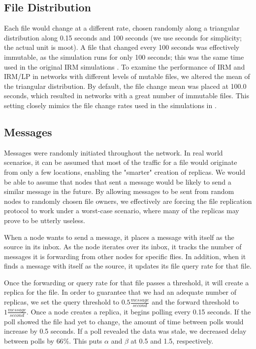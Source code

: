 \documentclass[10pt, conference, compsocconf, letterpaper]{IEEEtran} %
\begin{document}
\subsection{File Distribution}

Each file would change at a different rate, chosen randomly along a triangular distribution along 0.15 seconds and 100 seconds (we use seconds for simplicity; the actual unit is moot).  A file that changed every 100 seconds was effectively immutable, as the simulation runs for only 100 seconds; this was the same time used in the original IRM simulations \cite{IRM}.    To examine the performance of IRM and IRM/LP in networks with different levels of mutable files, we altered the mean of the triangular distribution.  By default, the file change mean was placed at 100.0 seconds, which resulted in networks with a great number of immutable files.  This setting closely mimics the file change rates used in the simulations in \cite{IRM}.


\subsection{Messages}
Messages were randomly initiated throughout the network.  In real world scenarios, it can be assumed that most of the traffic for a file would originate from only a few locations, enabling the "smarter" creation of replicas. We would be able to assume that nodes that sent a message would be likely to send a similar message in the future. By allowing messages to be sent from random nodes to randomly chosen file owners, we effectively are forcing the file replication protocol to work under a worst-case scenario, where many of the replicas may prove to be utterly useless. 


When a node wants to send a message, it places a message with itself as the source in its inbox.  As the node iterates over its inbox, it tracks the number of messages it is forwarding from other nodes for specific flies.  In addition, when it finds a message with itself as the source, it updates its file query rate for that file.  

Once the forwarding or query rate for that file passes a threshold, it will create a replica for the file. In order to guarantee that we had an adequate number of replicas, we set the query threshold to $0.5 \frac{message}{second}$ and the forward threshold to $1 \frac{message}{second}$.  Once a node creates a replica, it begins polling every 0.15 seconds. If the poll showed the file had yet to change, the amount of time between polls would increase by 0.5 seconds.  If a poll revealed the data was stale, we decreased delay between polls by $66\%$. This puts $\alpha$ and $\beta$ at 0.5 and 1.5, respectively.
\end{document}
